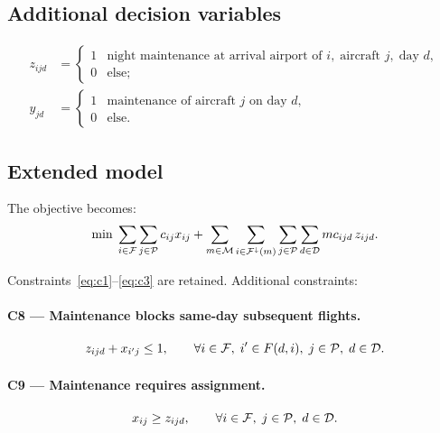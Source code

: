 \subsection{Additional decision variables}

\begin{align*}
  z_{ijd} &= \begin{cases}1 & \text{night maintenance at arrival airport of } i,\;
               \text{aircraft } j,\;\text{day } d, \\ 0 & \text{else;}\end{cases}\\
  y_{jd}  &= \begin{cases}1 & \text{maintenance of aircraft } j \text{ on day } d,
               \\ 0 & \text{else.}\end{cases}
\end{align*}

\subsection{Extended model}

The objective becomes:
\begin{equation}\label{eq:obj_ext}
  \min\; \sum_{i \in \mathcal{F}}\sum_{j \in \mathcal{P}} c_{ij} x_{ij}
  + \sum_{m \in \mathcal{M}}\sum_{i \in \mathcal{F}^{\downarrow}(m)}\sum_{j \in \mathcal{P}}\sum_{d \in \mathcal{D}}
    mc_{ijd}\, z_{ijd}.
\end{equation}

Constraints~\eqref{eq:c1}--\eqref{eq:c3} are retained.  Additional
constraints:

\paragraph{C8 — Maintenance blocks same-day subsequent flights.}
\begin{equation}\label{eq:c8}
  z_{ijd} + x_{i'j} \le 1,
  \qquad \forall i \in \mathcal{F},\; i' \in F(d,i),\; j \in \mathcal{P},\; d \in \mathcal{D}.
\end{equation}

\paragraph{C9 — Maintenance requires assignment.}
\begin{equation}\label{eq:c9}
  x_{ij} \ge z_{ijd},
  \qquad \forall i \in \mathcal{F},\; j \in \mathcal{P},\; d \in \mathcal{D}.
\end{equation}

